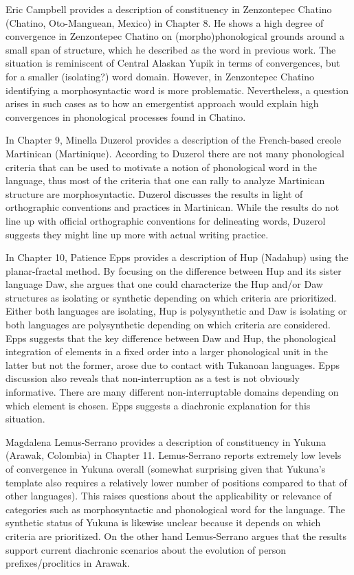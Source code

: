 \documentclass[output=paper,hidelinks]{langscibook}
\begin{document}
Eric Campbell provides a description of constituency in Zenzontepec Chatino (Chatino, Oto-Manguean, Mexico) in Chapter 8. He shows a high degree of convergence in Zenzontepec Chatino on (morpho)phonological grounds around a small span of structure, which he described as the word in previous work. The situation is reminiscent of Central Alaskan Yupik in terms of convergences, but for a smaller (isolating?) word domain. However, in Zenzontepec Chatino identifying a morphosyntactic word is more problematic. Nevertheless, a question arises in such cases as to how an emergentist approach would explain high convergences in phonological processes found in Chatino. 

In Chapter 9, Minella Duzerol provides a description of the French-based creole Martinican (Martinique). According to Duzerol there are not many phonological criteria that can be used to motivate a notion of phonological word in the language, thus most of the criteria that one can rally to analyze Martinican structure are morphosyntactic. Duzerol discusses the results in light of orthographic conventions and practices in Martinican. While the results do not line up with official orthographic conventions for delineating words, Duzerol suggests they might line up more with actual writing practice.

In Chapter 10, Patience Epps provides a description of Hup (Nadahup) using the planar-fractal method. By focusing on the difference between Hup and its sister language Daw, she argues that one could characterize the Hup and/or Daw structures as isolating or synthetic depending on which criteria are prioritized. Either both languages are isolating, Hup is polysynthetic and Daw is isolating or both languages are polysynthetic depending on which criteria are considered. Epps suggests that the key difference between Daw and Hup, the phonological integration of elements in a fixed order into a larger phonological unit in the latter but not the former, arose due to contact with Tukanoan languages. Epps discussion also reveals that non-interruption as a test is not obviously informative. There are many different non-interruptable domains depending on which element is chosen. Epps suggests a diachronic explanation for this situation.

Magdalena Lemus-Serrano provides a description of constituency in Yukuna (Arawak, Colombia) in Chapter 11. Lemus-Serrano reports extremely low levels of convergence in Yukuna overall (somewhat surprising given that Yukuna's template also requires a relatively lower number of positions compared to that of other languages). This raises questions about the applicability or relevance of categories such as morphosyntactic and phonological word for the language. The synthetic status of Yukuna is likewise unclear because it depends on which criteria are prioritized. On the other hand Lemus-Serrano argues that the results support current diachronic scenarios about the evolution of person prefixes/proclitics in Arawak.
\end{document}
